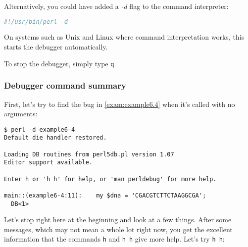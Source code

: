 Alternatively, you could have added a \textit{-d} flag to the command interpreter:

\begin{lstlisting}[language=bash]
#!/usr/bin/perl -d
\end{lstlisting}

On systems such as Unix and Linux where command interpretation works, this starts the debugger automatically.

To stop the debugger, simply type \verb|q|.

\subsubsection{Debugger command summary}
First, let's try to find the bug in \autoref{exam:example6.4} when it's called with no arguments:

\begin{lstlisting}
$ perl -d example6-4
Default die handler restored.

Loading DB routines from perl5db.pl version 1.07
Editor support available.

Enter h or 'h h' for help, or 'man perldebug' for more help.

main::(example6-4:11):    my $dna = 'CGACGTCTTCTAAGGCGA';
  DB<1> 
\end{lstlisting}

Let's stop right here at the beginning and look at a few things. After some messages, which may not mean a whole lot right now, you get the excellent information that the commands \verb|h| and \verb|h h| give more help. Let's try \verb|h h|:

